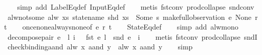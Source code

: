 \begin{isabellebody}
%
\isadelimproof
\ \ %
\endisadelimproof
%
\isatagproof
{}\isamarkupfalse%
\ {\isacharparenleft}simp\ add{\isacharcolon}\ LabelEq{\isacharunderscore}def\ InputEq{\isacharunderscore}def{\isacharparenright}\isanewline
\ \ \isamarkupfalse%
\ {\isacharparenleft}metis\ fst{\isacharunderscore}conv\ prod{\isachardot}collapse\ snd{\isacharunderscore}conv{\isacharparenright}%
\endisatagproof
{\isafoldproof}%
%
\isadelimproof
\isanewline
%
\endisadelimproof
\isanewline
{}\isamarkupfalse%
\ alw{\isacharunderscore}not{\isacharunderscore}some{\isacharcolon}\ {\isachardoublequoteopen}alw\ {\isacharparenleft}{\isasymlambda}xs{\isachardot}\ statename\ {\isacharparenleft}shd\ xs{\isacharparenright}\ {\isasymnoteq}\ Some\ s{\isacharparenright}\ {\isacharparenleft}make{\isacharunderscore}full{\isacharunderscore}observation\ e\ None\ r\ t{\isacharparenright}{\isachardoublequoteclose}\isanewline
%
\isadelimproof
\ \ %
\endisadelimproof
%
\isatagproof
{}\isamarkupfalse%
\ once{\isacharunderscore}none{\isacharunderscore}always{\isacharunderscore}none{\isacharbrackleft}of\ e\ r\ t{\isacharbrackright}\isanewline
\ \ \isamarkupfalse%
\ StateEq{\isacharunderscore}def\isanewline
\ \ \isamarkupfalse%
\ {\isacharparenleft}simp\ add{\isacharcolon}\ alw{\isacharunderscore}mono{\isacharparenright}%
\endisatagproof
{\isafoldproof}%
%
\isadelimproof
\isanewline
%
\endisadelimproof
\isanewline
{}\isamarkupfalse%
\ decompose{\isacharunderscore}pair{\isacharcolon}\ {\isachardoublequoteopen}e\ {\isasymnoteq}\ {\isacharparenleft}l{\isacharcomma}\ i{\isacharparenright}\ {\isacharequal}\ {\isacharparenleft}{\isasymnot}\ {\isacharparenleft}fst\ e\ {\isacharequal}l\ {\isasymand}\ snd\ e\ {\isacharequal}\ i{\isacharparenright}{\isacharparenright}{\isachardoublequoteclose}\isanewline
%
\isadelimproof
\ \ %
\endisadelimproof
%
\isatagproof
{}\isamarkupfalse%
\ {\isacharparenleft}metis\ fst{\isacharunderscore}conv\ prod{\isachardot}collapse\ sndI{\isacharparenright}%
\endisatagproof
{\isafoldproof}%
%
\isadelimproof
\isanewline
%
\endisadelimproof
\isanewline
{}\isamarkupfalse%
\ check{\isacharunderscore}binding{\isacharunderscore}aand{\isacharcolon}\ {\isachardoublequoteopen}{\isacharparenleft}alw\ x\ aand\ y{\isacharparenright}\ {\isacharequal}\ {\isacharparenleft}alw\ x{\isacharparenright}\ aand\ y{\isachardoublequoteclose}\isanewline
%
\isadelimproof
\ \ %
\endisadelimproof
%
\isatagproof
{}\isamarkupfalse%
\ simp%
\endisatagproof
{\isafoldproof}%

\end{isabellebody}
